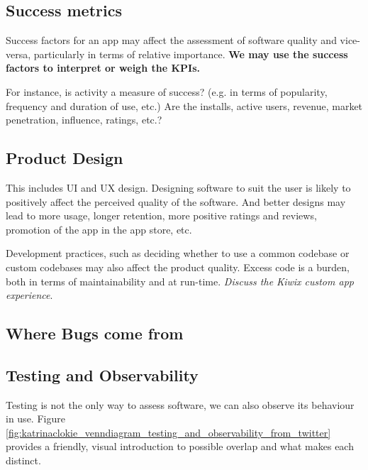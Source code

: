 \subsection{Success metrics}
Success factors for an app may affect the assessment of software quality and vice-versa, particularly in terms of relative importance. \textbf{We may use the success factors to interpret or weigh the KPIs.}

For instance, is activity a measure of success? (e.g. in terms of popularity, frequency and duration of use, etc.) Are the installs, active users, revenue, market penetration, influence, ratings, etc.? 

\subsection{Product Design}
This includes UI and UX design. Designing software to suit the user is likely to positively affect the perceived quality of the software. And better designs may lead to more usage, longer retention, more positive ratings and reviews, promotion of the app in the app store, etc.

Development practices, such as deciding whether to use a common codebase or custom codebases may also affect the product quality. Excess code is a burden, both in terms of maintainability and at run-time. \textit{Discuss the Kiwix custom app experience}.

\subsection{Where Bugs come from}

\subsection{Testing and Observability}
Testing is not the only way to assess software, we can also observe its behaviour in use. Figure \ref{fig:katrinaclokie_venndiagram_testing_and_observability_from_twitter} provides a friendly, visual introduction to possible overlap and what makes each distinct.

